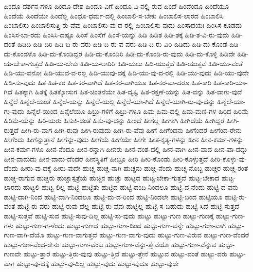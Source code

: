 {ಹಿಂದೂ-ದರ್ಶನ-ಗಳೂ
ಹಿಂದೂ-ದೇಶ
ಹಿಂದೂ-ವಿಗೆ
ಹಿಂದೂ-ವಿ-ನಲ್ಲಿ-ರುವ
ಹಿಂದೆ
ಹಿಂದೆಂದೂ
ಹಿಂದೆಯೂ
ಹಿಂದೆಯೆ
ಹಿಂದೆಯೇ
ಹಿಂದೆಲ್ಲ
ಹಿಂಧೂ-ಧರ್ಮ-ದಲ್ಲಿ
ಹಿಂಬಾಲಿ-ಸ-ಬೇಕು
ಹಿಂಬಾಲಿಸ-ಲಾರದ
ಹಿಂಬಾಲಿಸಿ
ಹಿಂಬಾಲಿಸು
ಹಿಂಬಾಲಿಸುತ್ತಿ-ರು-ವೆವು
ಹಿಂಬಾಲಿಸು-ವು-ದ-ರಲ್ಲಿ
ಹಿಂಬಾಲಿಸು-ವುದು
ಹಿಂಸಾದಯಃ
ಹಿಂಸಿಸ-ಕೂಡದು
ಹಿಂಸಿಸ-ಬಾ-ರದು
ಹಿಂಸಿಸಿ-ದಷ್ಟೂ
ಹಿಂಸೆ
ಹಿಂಸೆಗೆ
ಹಿಂಸೆ-ಯನ್ನು
ಹಿಡಿ
ಹಿಡಿತ
ಹಿಡಿ-ತಕ್ಕೆ
ಹಿಡಿ-ತ-ವಿ-ರು-ವುದು
ಹಿಡಿ-ದಂತೆ
ಹಿಡಿದಿ
ಹಿಡಿ-ದಿರಿ
ಹಿಡಿ-ದಿ-ರು-ವರು
ಹಿಡಿ-ದಿ-ರು-ವ-ವರು
ಹಿಡಿ-ದಿ-ರು-ವಿರಿ
ಹಿಡಿದು
ಹಿಡಿ-ದು-ಕೊಂಡ
ಹಿಡಿ-ದು-ಕೊಂಡಳೊ
ಹಿಡಿ-ದು-ಕೊಂಡಿದ್ದರೆ
ಹಿಡಿ-ದು-ಕೊಂಡಿರಿ
ಹಿಡಿ-ದು-ಕೊಂಡಿ-ರು-ವುದು
ಹಿಡಿ-ದು-ಕೊಳ್ಳಿ
ಹಿಡಿದೇ
ಹಿಡಿ-ಯ-ಬೇಕಾ-ಗುತ್ತದೆ
ಹಿಡಿ-ಯ-ಬೇಕು
ಹಿಡಿ-ಯ-ಲಾರಿರಿ
ಹಿಡಿ-ಯಲು
ಹಿಡಿ-ಯುತ್ತದೆ
ಹಿಡಿ-ಯುತ್ತವೆ
ಹಿಡಿ-ಯು-ವಂತೆ
ಹಿಡಿ-ಯು-ವನೋ
ಹಿಡಿ-ಯುವ-ವ-ರಲ್ಲ
ಹಿಡಿ-ಯುವು-ದಕ್ಕೆ
ಹಿಡಿ-ಯು-ವು-ದ-ರಲ್ಲಿ
ಹಿಡಿ-ಯು-ವುದು
ಹಿಡಿ-ಯು-ವುದೇ
ಹಿಡಿ-ಸು-ವುದು
ಹಿತ
ಹಿತ-ಕರ
ಹಿತ-ಕರ-ವಾಗಿದೆ
ಹಿತ-ಕರ-ವಾಗಿಯೂ
ಹಿತ-ಕರ-ವಾ-ದರೂ
ಹಿತ-ಕಾರಿ
ಹಿತ-ಕಾರಿ-ಯಾ-ಗಿದೆ
ಹಿತಕ್ಕಾಗಿ
ಹಿತಕ್ಕೆ
ಹಿತಕ್ಕೋಸುಗ
ಹಿತ-ಚಿಂತನೆಯೇ
ಹಿತ-ದೃಷ್ಟಿ
ಹಿತ-ರಕ್ಷಣೆ-ಯನ್ನು
ಹಿತ-ವನ್ನು
ಹಿತ-ವಾಗು-ವುದೆ
ಹಿನ್ನೆಲೆ
ಹಿನ್ನೆಲೆ-ಯಂತೆ
ಹಿನ್ನೆಲೆ-ಯನ್ನು
ಹಿನ್ನೆಲೆ-ಯಲ್ಲಿ
ಹಿನ್ನೆಲೆ-ಯಾ-ಗಿದೆ
ಹಿನ್ನೆಲೆ-ಯಾಗಿ-ರು-ವು-ದನ್ನು
ಹಿನ್ನೆಲೆ-ಯಾ-ಗು-ವುದು
ಹಿನ್ನೆಲೆ-ಯಿಂದ
ಹಿನ್ನೆಲೆಯೂ
ಹಿಬ್ರು-ಗಳಿಗೆ
ಹಿಬ್ರು-ಗಳೂ
ಹಿಮ
ಹಿಮ-ದಲ್ಲಿ
ಹಿಮ-ಮಣಿ-ಗಳ
ಹಿರಿದ
ಹಿರಿಮೆ
ಹಿರಿಮೆ-ಯನ್ನು
ಹಿರಿ-ಯರು
ಹಿಸುಕಿ-ದಂತೆ
ಹಿಸು-ವು-ದನ್ನು
ಹೀಂದೆ
ಹೀಗಲ್ಲ
ಹೀಗಾಗಿ
ಹೀಗಿದೆಯೆ
ಹೀಗಿದ್ದರೆ
ಹೀಗಿ-ರುತ್ತದೆ
ಹೀಗಿ-ರು-ವಾಗ
ಹೀಗಿ-ರುವು
ಹೀಗಿ-ರುವುದು
ಹೀಗಿ-ರು-ವೆವು
ಹೀಗೆ
ಹೀಗೆಂದನು
ಹೀಗೆಂದರೆ
ಹೀಗೆಂದ-ರೇನು
ಹೀಗೆಂದು
ಹೀಗೆನ್ನುತ್ತಾನೆ
ಹೀಗೆನ್ನು-ವುದು
ಹೀಗೆಯೆ
ಹೀಗೆಯೇ
ಹೀಗೇ
ಹೀತ-ಕೃತ್ಯ-ಗಳನ್ನು
ಹೀನ
ಹೀನ-ಕರ್ಮ-ಗಳನ್ನು
ಹೀನ-ಕರ್ಮ-ಗಳೂ
ಹೀನ-ನೆಂದೂ
ಹೀನ-ರನ್ನಾಗಿ
ಹೀನರು
ಹೀನ-ವಂಶ-ದಲ್ಲಿ
ಹೀನ-ವಾಗಿ
ಹೀನ-ವಾದ
ಹೀನ-ವಾ-ದದ್ದು
ಹೀನ-ವಾದುದು
ಹೀನ-ವಾದು-ದೆಂದರೆ
ಹೀನಸ್ಥಿತಿಗೆ
ಹೀಬ್ರೂ
ಹೀರಿ
ಹೀರಿ-ಕೊಂಡು
ಹೀರಿ-ಕೊಳ್ಳುತ್ತದೆ
ಹೀರಿ-ಕೊಳ್ಳು-ವು-ದೆಂದು
ಹೀರು-ವು-ದಕ್ಕೆ
ಹೀರು-ವುದೇ
ಹುಚ್ಚ
ಹುಚ್ಚ-ನಾಗಿ
ಹುಚ್ಚನು
ಹುಚ್ಚ-ನೆಂದು
ಹುಚ್ಚ-ನೊಬ್ಬ
ಹುಚ್ಚರ
ಹುಚ್ಚ-ರಂತೆ
ಹುಚ್ಚ-ರಾಗುವ
ಹುಚ್ಚರು
ಹುಚ್ಚಾಸ್ಪತ್ರೆಯ
ಹುಚ್ಚಿನ
ಹುಚ್ಚು
ಹುಟ್ಟದ
ಹುಟ್ಟ-ಬೇಕಾ-ಗುತ್ತದೆ
ಹುಟ್ಟ-ಬೇಕಾದ
ಹುಟ್ಟ-ಲಾರದು
ಹುಟ್ಟಲಿ
ಹುಟ್ಟ-ಲಿಲ್ಲ
ಹುಟ್ಟಿ
ಹುಟ್ಟಿತು
ಹುಟ್ಟಿದ
ಹುಟ್ಟಿ-ದಂದಿ-ನಿಂದಲೂ
ಹುಟ್ಟಿ-ದ-ನೆಂದು
ಹುಟ್ಟಿ-ದ-ವನು
ಹುಟ್ಟಿ-ದಾಗಿ-ನಿಂದ
ಹುಟ್ಟಿ-ದಾಗಿ-ನಿಂದಲೂ
ಹುಟ್ಟಿ-ದು-ದ-ರಿಂದ
ಹುಟ್ಟಿ-ನಿಂದಲೇ
ಹುಟ್ಟಿ-ಬಂದ
ಹುಟ್ಟಿಯೂ
ಹುಟ್ಟಿ-ರು-ವಂತೆ
ಹುಟ್ಟಿ-ರು-ವರು
ಹುಟ್ಟಿ-ರುವು-ದೆಲ್ಲ
ಹುಟ್ಟಿ-ರು-ವೆವು
ಹುಟ್ಟಿಲ್ಲ
ಹುಟ್ಟಿ-ಸ-ಬಹುದು
ಹುಟ್ಟಿ-ಸಿದೆ
ಹುಟ್ಟಿ-ಸುತ್ತದೆ
ಹುಟ್ಟಿ-ಸುತ್ತವೆ
ಹುಟ್ಟಿ-ಸುವ
ಹುಟ್ಟಿ-ಸುವು-ದಿಲ್ಲ
ಹುಟ್ಟಿ-ಸು-ವುದು
ಹುಟ್ಟು
ಹುಟ್ಟು-ಗುಣ
ಹುಟ್ಟು-ಗುಣಕ್ಕೆ
ಹುಟ್ಟು-ಗುಣ-ಗಳು
ಹುಟ್ಟು-ಗುಣ-ಗ-ಳೆಂದು
ಹುಟ್ಟು-ಗುಣದ
ಹುಟ್ಟು-ಗುಣ-ದಿಂದ
ಹುಟ್ಟು-ಗುಣ-ವನ್ನೇ
ಹುಟ್ಟು-ಗುಣ-ವಾಗಿ
ಹುಟ್ಟು-ಗುಣ-ವಾಗಿ-ದೆಯೊ
ಹುಟ್ಟು-ಗುಣ-ವಾಗುತ್ತದೆ
ಹುಟ್ಟು-ಗುಣ-ವಾಗು-ವುದು
ಹುಟ್ಟು-ಗುಣ-ವಿರುವ
ಹುಟ್ಟು-ಗುಣ-ವೆಂದರೆ
ಹುಟ್ಟು-ಗುಣ-ವೆಂದ-ರೇನು
ಹುಟ್ಟು-ಗುಣ-ವೆಂಬ
ಹುಟ್ಟು-ಗುಣ-ವೆನ್ನು-ತ್ತೇವೆಯೊ
ಹುಟ್ಟು-ಗುಣ-ವೆನ್ನುವ
ಹುಟ್ಟು-ಗುಣವೇ
ಹುಟ್ಟು-ತ್ತಾರೆ
ಹುಟ್ಟು-ತ್ತಿರು-ವುವು
ಹುಟ್ಟು-ತ್ತಿವೆ
ಹುಟ್ಟು-ತ್ತೇನೆ
ಹುಟ್ಟುವ
ಹುಟ್ಟು-ವಂತೆ
ಹುಟ್ಟು-ವರು
ಹುಟ್ಟು-ವಾಗ
ಹುಟ್ಟು-ವು-ದಕ್ಕೆ
ಹುಟ್ಟು-ವು-ದಿಲ್ಲ
ಹುಟ್ಟು-ವುದು
ಹುಟ್ಟು-ವುದೂ
ಹುಟ್ಟು-ವುದೇ
}

